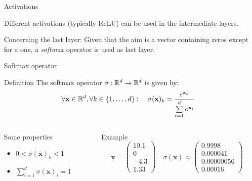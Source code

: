 \documentclass[xcolor=pdftex,dvipsnames,table,mathserif]{beamer}
\newcommand{\myvec}[1]{\ensuremath{\begin{pmatrix}#1\end{pmatrix}}}
\begin{document}
\begin{frame}{Activations}

  Different activations (typically ReLU) can be used in the intermediate layers.
  \vspace{1em}

  Concerning the last layer: Given that the aim is a vector containing zeros except for a one, a \emph{softmax} operator is used as last layer.


\end{frame}

\begin{frame}{Softmax operator}

  \begin{block}{Definition}
    The softmax operator $\sigma: \mathbb{R}^d \rightarrow \mathbb{R}^d$ is given by:
    \[
    \forall \mathbf{x}  \in \mathbb{R}^d, \forall k \in \{1, \ldots, d\}:\quad \sigma(\mathbf{x})_k = \frac{e^{\mathbf{x}_k}}{\sum\limits_{i=1}^d e^{\mathbf{x}_i}}
    \]
  \end{block}

  \pause

  \begin{columns}
    \begin{column}{.3\textwidth}
      \begin{block}{Some properties}
        \begin{itemize}
        \item $0 < \sigma(\mathbf{x})_k < 1$
        \item $\sum\limits_{i=1}^d \sigma(\mathbf{x})_i = 1$
        \end{itemize}
      \end{block}

    \end{column}

    \pause

    \begin{column}{.7\textwidth}

      \begin{block}{Example}
        \[
        \mathbf{x} = \myvec{10.1\\0\\-4.3\\1.33}  \quad \sigma(\mathbf{x}) \approx \myvec{0.9998\\0.000041\\0.00000056\\0.00016}
        \]

      \end{block}



    \end{column}
  \end{columns}



\end{frame}
\end{document}
